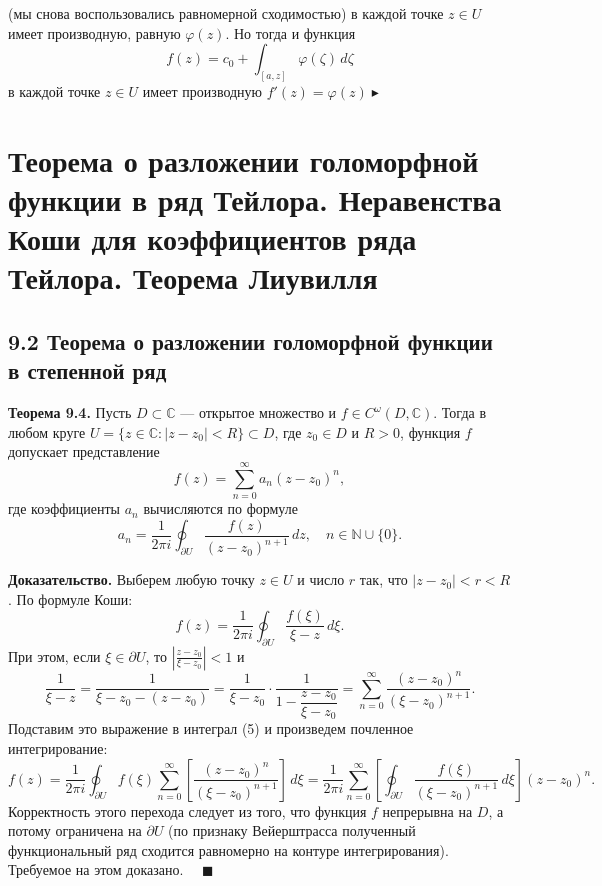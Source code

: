 \documentclass[12pt, a4paper]{article}
\theoremstyle{definition}
\theoremstyle{remark}
\begin{document}
(мы снова воспользовались равномерной сходимостью) в каждой точке $z \in U$ имеет производную, равную $\varphi(z)$. Но тогда и функция
$$
f(z) = c_0 + \int_{[a, z]} \varphi(\zeta) \, d\zeta
$$
в каждой точке $z \in U$ имеет производную $f'(z) = \varphi(z) \blacktriangleright$

\newpage
\section{Теорема о разложении голоморфной функции в ряд Тейлора. Неравенства Коши для коэффициентов ряда Тейлора. Теорема Лиувилля}

\subsection{9.2 Теорема о разложении голоморфной функции в степенной ряд}

\textbf{Теорема 9.4.} Пусть $D \subset \mathbb{C}$ — открытое множество и $f \in C^{\omega}(D, \mathbb{C})$. Тогда в любом круге $U = \{z \in \mathbb{C} : |z - z_0| < R\} \subset D$, где $z_0 \in D$ и $R > 0$, функция $f$ допускает представление
\begin{equation}
	f(z) = \sum_{n=0}^{\infty} a_n(z - z_0)^n,
\end{equation}
где коэффициенты $a_n$ вычисляются по формуле
\[
a_n = \frac{1}{2\pi i} \oint_{\partial U} \frac{f(z)}{(z - z_0)^{n+1}} \, dz, \quad n \in \mathbb{N} \cup \{0\}.
\]

\textbf{Доказательство.} Выберем любую точку $z \in U$ и число $r$ так, что $|z - z_0| < r < R$. По формуле Коши:
\begin{equation}
	f(z) = \frac{1}{2\pi i} \oint_{\partial U} \frac{f(\xi)}{\xi - z} \, d\xi.
\end{equation}
При этом, если $\xi \in \partial U$, то $\left| \frac{z - z_0}{\xi - z_0} \right| < 1$ и
\[
\frac{1}{\xi - z} = \frac{1}{\xi - z_0 - (z - z_0)} = \frac{1}{\xi - z_0} \cdot \frac{1}{1 - \dfrac{z - z_0}{\xi - z_0}} = \sum_{n=0}^{\infty} \frac{(z - z_0)^n}{(\xi - z_0)^{n+1}}.
\]
Подставим это выражение в интеграл (5) и произведем почленное интегрирование:
\[
f(z) = \frac{1}{2\pi i} \oint_{\partial U} f(\xi) \sum_{n=0}^{\infty} \left[ \frac{(z - z_0)^n}{(\xi - z_0)^{n+1}} \right] \, d\xi = \frac{1}{2\pi i} \sum_{n=0}^{\infty} \left[ \oint_{\partial U} \frac{f(\xi)}{(\xi - z_0)^{n+1}} \, d\xi \right] (z - z_0)^n.
\]
Корректность этого перехода следует из того, что функция $f$ непрерывна на $D$, а потому ограничена на $\partial U$ (по признаку Вейерштрасса полученный функциональный ряд сходится равномерно на контуре интегрирования). Требуемое на этом доказано. $\quad \blacksquare$
\end{document}
